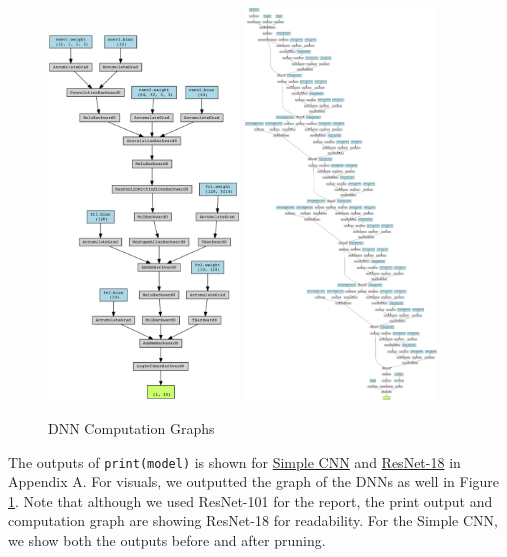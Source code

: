 \documentclass{article}
\begin{document}
\begin{figure}
    \centerline{
        \includegraphics[width=2in]{../proj1/figures/mnist_cnn.png}
        \includegraphics[width=2in]{../proj1/figures/resnet18.png}
    }
    \caption{DNN Computation Graphs}
    \label{fig:dnngraph}
\end{figure}

The outputs of \verb|print(model)| is shown for \hyperref[sec:A1]{Simple CNN} and \hyperref[sec:A2]{ResNet-18} in Appendix A. For visuals, we outputted the graph of the DNNs as well in Figure \ref{fig:dnngraph}. Note that although we used ResNet-101 for the report, the print output and computation graph are showing ResNet-18 for readability. For the Simple CNN, we show both the outputs before and after pruning.
\end{document}
